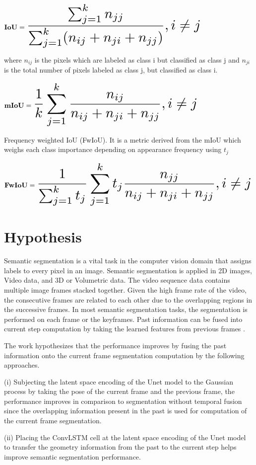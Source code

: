 	$
	{\bf IoU} = \scalemath{2}{\frac{\sum_{j=1}^{k} n_{jj}}{\sum_{j=1}^{k} (n_{ij}+n_{ji}+n_{jj})}, i \neq j }
	$

	where $ n_{ij}$ is the pixels which are labeled as class i but classified as class j and $n_{ji}$ is the total number of pixels labeled as class j, but classified as class i. \cite{84_ulku2022survey}
	
	$
	{\bf mIoU} = \scalemath{2}{\frac{1}{k} \sum_{j=1}^k \frac{n_{ij}}{n_{ij}+n_{ji}+n_{jj}},  i \neq j }
	$
	
	Frequency weighted IoU (FwIoU). It is a metric derived from the mIoU which weighs each class importance depending on appearance frequency using $t_j$ \cite{84_ulku2022survey}
	
	$
	{\bf FwIoU} = \scalemath{2} {\frac{1}{\sum_{j=1}^k t_j} \sum_{j=1}^{k} t_j \frac{n_{jj}}{n_{ij}+n_{ji}+n_{jj}}, i \neq j }
	$
    
    \section{Hypothesis}
    
    Semantic segmentation is a vital task in the computer vision domain that assigns labels to every pixel in an image. Semantic segmentation is applied in 2D images, Video data, and 3D or Volumetric data. The video sequence data contains multiple image frames stacked together. Given the high frame rate of the video, the consecutive frames are related to each other due to the overlapping regions in the successive frames. In most semantic segmentation tasks, the segmentation is performed on each frame or the keyframes. Past information can be fused into current step computation by taking the learned features from previous frames \cite{78_hu2020temporally}.
    
    The work hypothesizes that the performance improves by fusing the past information onto the current frame segmentation computation by the following approaches.
    
    (i) Subjecting the latent space encoding of the Unet model to the Gaussian process by taking the pose of the current frame and the previous frame, the performance improves in comparison to segmentation without temporal fusion since the overlapping information present in the past is used for computation of the current frame segmentation.
    
    (ii) Placing the ConvLSTM cell at the latent space encoding of the Unet model to transfer the geometry information from the past to the current step helps improve semantic segmentation performance. 
    
